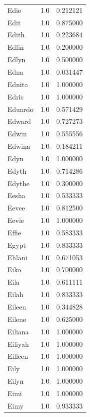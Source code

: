 \documentclass[
  letterpaper,
  DIV=11,
  numbers=noendperiod]{scrreprt}
\begin{document}
\begin{tabular}{lrr}
Edie            &   1.0 &   0.212121 \\
Edit            &   1.0 &   0.875000 \\
Edith           &   1.0 &   0.223684 \\
Edlin           &   1.0 &   0.200000 \\
Edlyn           &   1.0 &   0.500000 \\
Edna            &   1.0 &   0.031447 \\
Ednita          &   1.0 &   1.000000 \\
Edris           &   1.0 &   1.000000 \\
Eduardo         &   1.0 &   0.571429 \\
Edward          &   1.0 &   0.727273 \\
Edwin           &   1.0 &   0.555556 \\
Edwina          &   1.0 &   0.184211 \\
Edyn            &   1.0 &   1.000000 \\
Edyth           &   1.0 &   0.714286 \\
Edythe          &   1.0 &   0.300000 \\
Eesha           &   1.0 &   0.533333 \\
Eevee           &   1.0 &   0.812500 \\
Eevie           &   1.0 &   1.000000 \\
Effie           &   1.0 &   0.583333 \\
Egypt           &   1.0 &   0.833333 \\
Ehlani          &   1.0 &   0.671053 \\
Eiko            &   1.0 &   0.700000 \\
Eila            &   1.0 &   0.611111 \\
Eilah           &   1.0 &   0.833333 \\
Eileen          &   1.0 &   0.344828 \\
Eilene          &   1.0 &   0.625000 \\
Eiliana         &   1.0 &   1.000000 \\
Eiliyah         &   1.0 &   1.000000 \\
Eilleen         &   1.0 &   1.000000 \\
Eily            &   1.0 &   1.000000 \\
Eilyn           &   1.0 &   1.000000 \\
Eimi            &   1.0 &   1.000000 \\
Eimy            &   1.0 &   0.933333 \\

\end{tabular}
\end{document}
